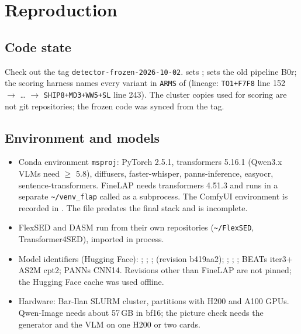 \section{Reproduction}\label{sec:repro}

\subsection{Code state}
Check out the tag \texttt{detector-frozen-2026-10-02}.  sets \Dp; 
sets the old pipeline B0r; the scoring harness names every variant in \texttt{ARMS} of
 (lineage: \texttt{TO1+F7F8} line 152 $\to$ \ldots{} $\to$ \texttt{SHIP8+MD3+WW5+SL}
line 243). The cluster copies used for scoring are not git repositories; the frozen code was synced from the tag.

\subsection{Environment and models}
\begin{itemize}
  \item Conda environment \texttt{msproj}: PyTorch 2.5.1, transformers 5.16.1 (Qwen3.x VLMs need $\geq$ 5.8), diffusers,
        faster-whisper, panns-inference, easyocr, sentence-transformers. FineLAP needs transformers 4.51.3 and runs in a
        separate \texttt{\textasciitilde/venv\_flap} called as a subprocess. The ComfyUI environment is recorded in
        . The  file predates the final stack and is incomplete.
  \item FlexSED and DASM run from their own repositories (\texttt{\textasciitilde/FlexSED}, Transformer4SED), imported in
        process.
  \item Model identifiers (Hugging Face): ; ;
        ;  (revision b419aa2); ;
        ; ; BEATs iter3+ AS2M cpt2; PANNs CNN14.
        Revisions other than FineLAP are not pinned; the Hugging Face cache was used offline.
  \item Hardware: Bar-Ilan SLURM cluster, partitions with H200 and A100 GPUs. Qwen-Image needs about 57\,GB in bf16; the
        picture check needs the generator and the VLM on one H200 or two cards.
\end{itemize}

